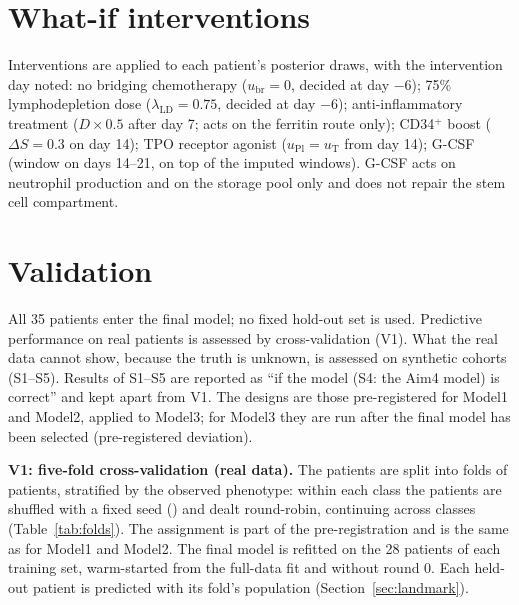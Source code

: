 \documentclass[11pt]{article}
\begin{document}
\section{What-if interventions}
Interventions are applied to each patient's posterior draws, with the intervention day noted: no bridging chemotherapy ($u_{\mathrm{br}}=0$, decided at day $-6$); 75\% lymphodepletion dose ($\lambda_{\mathrm{LD}}=0.75$, decided at day $-6$); anti-inflammatory treatment ($D\times0.5$ after day 7; acts on the ferritin route only); CD34$^+$ boost ($\Delta S=0.3$ on day 14); TPO receptor agonist ($u_{\mathrm{Pl}}=u_{\mathrm{T}}$ from day 14); G-CSF (window on days 14--21, on top of the imputed windows). G-CSF acts on neutrophil production and on the storage pool only and does not repair the stem cell compartment.

\section{Validation}\label{sec:validation}
All 35 patients enter the final model; no fixed hold-out set is used. Predictive performance on real patients is assessed by cross-validation (V1). What the real data cannot show, because the truth is unknown, is assessed on synthetic cohorts (S1--S5). Results of S1--S5 are reported as ``if the model (S4: the Aim4 model) is correct'' and kept apart from V1. The designs are those pre-registered for Model1 and Model2, applied to Model3; for Model3 they are run after the final model has been selected (pre-registered deviation).

\textbf{V1: five-fold cross-validation (real data).} The patients are split into \valVk{} folds of \valVper{} patients, stratified by the observed phenotype: within each class the patients are shuffled with a fixed seed (\valVseed) and dealt round-robin, continuing across classes (Table~\ref{tab:folds}). The assignment is part of the pre-registration and is the same as for Model1 and Model2. The final model is refitted on the 28 patients of each training set, warm-started from the full-data fit and without round 0. Each held-out patient is predicted with its fold's population (Section~\ref{sec:landmark}).


\end{document}
